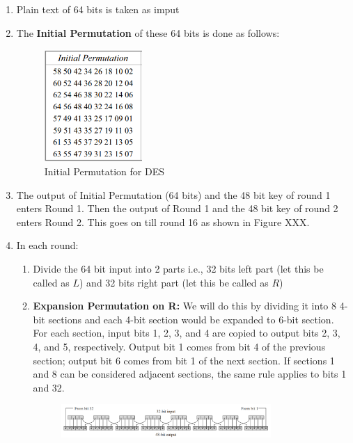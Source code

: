 \documentclass[a4paper]{report} %
\begin{document}
\begin{enumerate}

    \item Plain text of 64 bits is taken as imput 
    \item The \textbf{Initial Permutation} of these 64 bits is done as follows: \\ 
    \begin{figure}[h]
    \centering
    \includegraphics[width=0.35\textwidth]{images/InitialPermutation_DES.PNG}
    \caption{Initial Permutation for DES}
    \end{figure}
    \item The output of Initial Permutation (64 bits) and the 48 bit key of round 1 enters Round 1. Then the output of Round 1 and the 48 bit key of round 2 enters Round 2. This goes on till round 16 as shown in Figure XXX. 
    \item In each round: 
    \begin{enumerate}
        \item Divide the 64 bit input into 2 parts i.e., 32 bits left part (let this be called as $L$) and 32 bits right part (let this be called as $R$)
        \item \textbf{Expansion Permutation on R:} We will do this by dividing it into 8 4-bit sections and each 4-bit section would be expanded to 6-bit section. For each section, input bits 1, 2, 3, and 4 are copied to output bits 2, 3, 4, and 5, respectively. Output bit 1 comes from bit 4 of the previous section; output bit 6 comes from bit 1 of the next section. If sections 1 and 8 can be considered adjacent sections, the same rule applies to bits 1 and 32. \\ 
        \begin{figure}[h]
        \centering
        \includegraphics[width=0.8\textwidth]{images/ExpansionPermutation_DES.PNG}

\end{figure}
\end{enumerate}
\end{enumerate}
\end{document}
